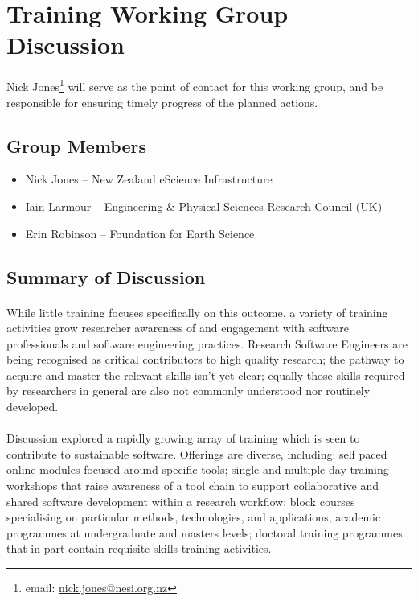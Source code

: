 \section{Training Working Group Discussion}
\label{sec:appendix_training}

Nick Jones\footnote{email: \href{mailto:nick.jones@nesi.org.nz}{nick.jones@nesi.org.nz}} will serve as the point of contact for this working group, and be responsible for ensuring timely progress of the planned actions.

\subsection{Group Members}
\begin{itemize}
\item Nick Jones -- New Zealand eScience Infrastructure
\item Iain Larmour -- Engineering \& Physical Sciences Research Council (UK)
\item Erin Robinson -- Foundation for Earth Science
\end{itemize}

\subsection{Summary of Discussion}

\paragraph{}
While little training focuses specifically on this outcome, a variety of training activities grow researcher awareness of and engagement with software professionals and software engineering practices. Research Software Engineers are being recognised as critical contributors to high quality research; the pathway to acquire and master the relevant skills isn’t yet clear; equally those skills required by researchers in general are also not commonly understood nor routinely developed.
\paragraph{}
Discussion explored a rapidly growing array of training which is seen to contribute to sustainable software. Offerings are diverse, including: self paced online modules focused around specific tools; single and multiple day training workshops that raise awareness of a tool chain to support collaborative and shared software development within a research workflow; block courses specialising on particular methods, technologies, and applications; academic programmes at undergraduate and masters levels; doctoral training programmes that in part contain requisite skills training activities.
